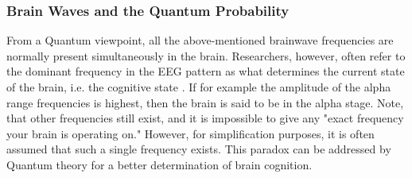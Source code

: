 \subsubsection{Brain Waves and the Quantum Probability}
From a Quantum viewpoint, all the above-mentioned brainwave frequencies are normally present simultaneously in the brain. Researchers, however, often refer to the dominant frequency in the EEG pattern as what determines the current state of the brain, i.e. the cognitive state \cite{Aufenberg2005}. If for example the amplitude of the alpha range frequencies is highest, then the brain is said to be in the alpha stage. Note, that other frequencies still exist, and it is impossible to give any "exact frequency your brain is operating on." However, for simplification purposes, it is often assumed that such a single frequency exists. This paradox can be addressed by Quantum theory for a better determination of brain cognition.\\

